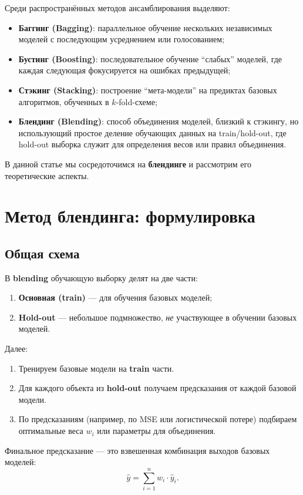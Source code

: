 Среди распространённых методов ансамблирования выделяют:
\begin{itemize}
    \item \textbf{Баггинг (Bagging)}: параллельное обучение нескольких независимых моделей с последующим усреднением или голосованием;
    \item \textbf{Бустинг (Boosting)}: последовательное обучение ``слабых'' моделей, где каждая следующая фокусируется на ошибках предыдущей;
    \item \textbf{Стэкинг (Stacking)}: построение ``мета-модели'' на предиктах базовых алгоритмов, обученных в $k$-fold-схеме;
    \item \textbf{Блендинг (Blending)}: способ объединения моделей, близкий к стэкингу, но использующий простое деление обучающих данных на train/hold-out, где hold-out выборка служит для определения весов или правил объединения.
\end{itemize}

В данной статье мы сосредоточимся на \textbf{блендинге} и рассмотрим его теоретические аспекты.

\section{Метод блендинга: формулировка}
\subsection{Общая схема}
В \textbf{blending} обучающую выборку делят на две части:
\begin{enumerate}
    \item \textbf{Основная (train)} --- для обучения базовых моделей;
    \item \textbf{Hold-out} --- небольшое подмножество, \textit{не} участвующее в обучении базовых моделей.
\end{enumerate}

Далее:
\begin{enumerate}
    \item Тренируем базовые модели на \textbf{train} части.
    \item Для каждого объекта из \textbf{hold-out} получаем предсказания от каждой базовой модели.
    \item По предсказаниям (например, по MSE или логистической потере) подбираем оптимальные веса $w_i$ или параметры для объединения.  
\end{enumerate}

Финальное предсказание --- это взвешенная комбинация выходов базовых моделей:
\[
\hat{y} = \sum_{i=1}^n w_i \cdot \hat{y}_i.
\]

